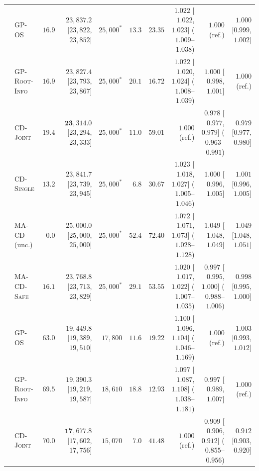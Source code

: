 \documentclass{article}
\theoremstyle{plain}
\theoremstyle{definition}
\begin{document}
\begin{table}[!htbp]
{\begin{tabular}{@{}llrrrrrrrr@{}}
\midrule
{}
  & \textsc{GP-OS}             & $16.9$  & $23{,}837.2$ [$23{,}822$, $23{,}852$] & $25{,}000^*$ & $13.3$ & $23.35$ & $1.022$ [$1.022$, $1.023$] ($1.009$--$1.038$) & $1.000$ (ref.) & $1.000$ [$0.999$, $1.002$] \\
  & \textsc{GP-Root-Info}      & $16.9$  & $23{,}827.4$ [$23{,}793$, $23{,}867$] & $25{,}000^*$ & $20.1$ & $16.72$ & $1.022$ [$1.020$, $1.024$] ($1.008$--$1.039$) & $1.000$ [$0.998$, $1.001$] & $1.000$ (ref.) \\
  & \textsc{CD-Joint}          & $\mathbf{19.4}$ & $\mathbf{23{,}314.0}$ [$23{,}294$, $23{,}333$] & $25{,}000^*$ & $11.0$ & $59.01$ & $1.000$ (ref.) & $\mathbf{0.978}$ [$0.977$, $0.979$] ($0.963$--$0.991$) & $\mathbf{0.979}$ [$0.977$, $0.980$] \\
  & \textsc{CD-Single}         & $13.2$  & $23{,}841.7$ [$23{,}739$, $23{,}945$] & $25{,}000^*$ & $6.8$  & $30.67$ & $1.023$ [$1.018$, $1.027$] ($1.005$--$1.046$) & $1.000$ [$0.996$, $1.005$] & $1.001$ [$0.996$, $1.005$] \\
  & \textsc{MA-CD} (unc.)      & $0.0$   & $25{,}000.0$ [$25{,}000$, $25{,}000$] & $25{,}000^*$ & $52.4$ & $72.40$ & $1.072$ [$1.071$, $1.073$] ($1.028$--$1.128$) & $1.049$ [$1.048$, $1.049$] & $1.049$ [$1.048$, $1.051$] \\
  & \textsc{MA-CD-Safe}        & $16.1$  & $23{,}768.8$ [$23{,}713$, $23{,}829$] & $25{,}000^*$ & $29.1$ & $53.55$ & $1.020$ [$1.017$, $1.022$] ($1.007$--$1.035$) & $0.997$ [$0.995$, $1.000$] ($0.988$--$1.006$) & $0.998$ [$0.995$, $1.000$] \\
\midrule
{}
  & \textsc{GP-OS}             & $63.0$  & $19{,}449.8$ [$19{,}389$, $19{,}510$] & $17{,}800$ & $11.6$ & $19.22$ & $1.100$ [$1.096$, $1.104$] ($1.046$--$1.169$) & $1.000$ (ref.) & $1.003$ [$0.993$, $1.012$] \\
  & \textsc{GP-Root-Info}      & $69.5$  & $19{,}390.3$ [$19{,}219$, $19{,}587$] & $18{,}610$ & $18.8$ & $12.93$ & $1.097$ [$1.087$, $1.108$] ($1.038$--$1.181$) & $0.997$ [$0.989$, $1.007$] & $1.000$ (ref.) \\
  & \textsc{CD-Joint}          & $\mathbf{70.0}$ & $\mathbf{17{,}677.8}$ [$17{,}602$, $17{,}756$] & $15{,}070$ & $7.0$  & $41.48$ & $1.000$ (ref.) & $\mathbf{0.909}$ [$0.906$, $0.912$] ($0.855$--$0.956$) & $\mathbf{0.912}$ [$0.903$, $0.920$] \\

\end{tabular}}
\end{table}
\end{document}
